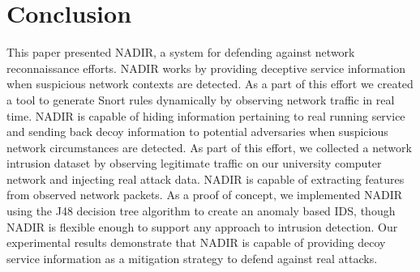 \section{Conclusion}
\label{conclusion}

This paper presented NADIR, a system for defending against network reconnaissance efforts. NADIR works by providing deceptive service information when suspicious network contexts are detected. As a part of
this effort we created a tool to generate Snort rules dynamically by observing network traffic in real time. NADIR is capable of hiding information pertaining to real running service and sending back decoy 
information to potential adversaries when suspicious network circumstances are detected. As part of this effort, we collected a network intrusion dataset by observing legitimate traffic on our university 
computer network and injecting real attack data. NADIR is capable of extracting features from observed network packets. As a proof of concept, we implemented NADIR using the J48 decision tree algorithm to 
create an anomaly based IDS, though NADIR is flexible enough to support any approach to intrusion detection. Our experimental results demonstrate that NADIR is capable of providing decoy service information 
as a mitigation strategy to defend against real attacks.



